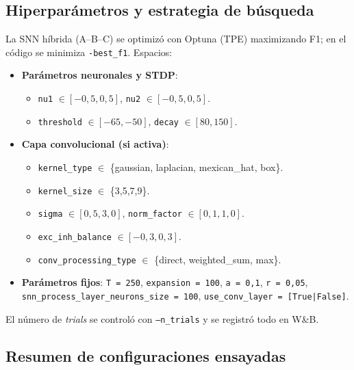 \subsection{Hiperparámetros y estrategia de búsqueda}
La SNN híbrida (A--B--C) se optimizó con Optuna (TPE) maximizando F1; en el código se minimiza \texttt{-best\_f1}. Espacios:
\begin{itemize}
    \item \textbf{Parámetros neuronales y STDP}:
    \begin{itemize}
        \item \texttt{nu1} \(\in [-0{,}5, 0{,}5]\), \texttt{nu2} \(\in [-0{,}5, 0{,}5]\).
        \item \texttt{threshold} \(\in [-65, -50]\), \texttt{decay} \(\in [80, 150]\).
    \end{itemize}
    \item \textbf{Capa convolucional (si activa)}:
    \begin{itemize}
        \item \texttt{kernel\_type} \(\in\) \{gaussian, laplacian, mexican\_hat, box\}.
        \item \texttt{kernel\_size} \(\in\) \{3,5,7,9\}.
        \item \texttt{sigma} \(\in [0{,}5, 3{,}0]\), \texttt{norm\_factor} \(\in [0{,}1, 1{,}0]\).
        \item \texttt{exc\_inh\_balance} \(\in [-0{,}3, 0{,}3]\).
        \item \texttt{conv\_processing\_type} \(\in\) \{direct, weighted\_sum, max\}.
    \end{itemize}
    \item \textbf{Parámetros fijos}: \texttt{T = 250}, \texttt{expansion = 100}, \texttt{a = 0{,}1}, \texttt{r = 0{,}05}, \texttt{snn\_process\_layer\_neurons\_size = 100}, \texttt{use\_conv\_layer = [True|False]}.
\end{itemize}
El número de \textit{trials} se controló con \texttt{--n\_trials} y se registró todo en W\&B.

\subsection{Resumen de configuraciones ensayadas}

